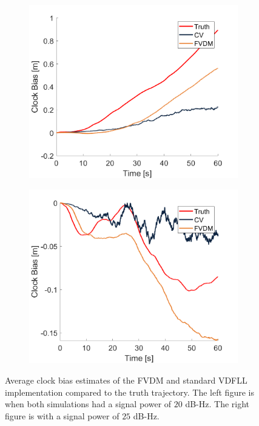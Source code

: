 \begin{figure}[!ht]
    \begin{subfigure}{.45\textwidth}
        \centering
        \includegraphics[width=1\linewidth]{Figures/dynamic/25/CLOCKBIAS.png}
    \end{subfigure}
    \begin{subfigure}{.45\textwidth}
        \centering
        \includegraphics[width=1\linewidth]{Figures/dynamic/35/CLOCKBIAS.png}
    \end{subfigure}
    \caption{Average clock bias estimates of the FVDM and standard VDFLL implementation compared to the truth trajectory. The left figure is when both simulations had a signal power of \(20\) dB-Hz. The right figure is with a signal power of \(25\) dB-Hz.}\label{fig:Clocks3}
\end{figure}

